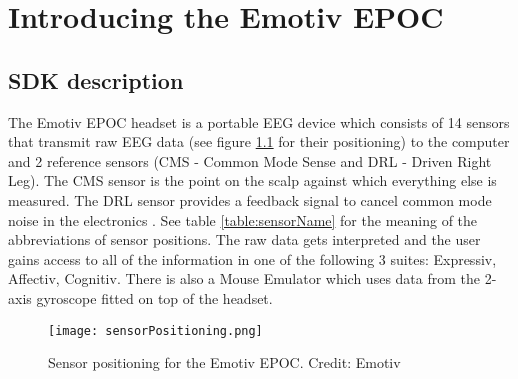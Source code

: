 \chapter{Introducing the Emotiv EPOC}
\label{cha:epoc}

\section{SDK description}
The Emotiv EPOC headset is a portable EEG device which consists of 14 sensors that transmit raw EEG data (see figure \ref{fig:sensorPos} for their positioning) to the computer and 2 reference sensors (CMS - Common Mode Sense and DRL - Driven Right Leg). The CMS sensor is the point on the scalp against which everything else is measured. The DRL sensor provides a feedback signal to cancel common mode noise in the electronics \cite{refSensors1, refSensors2}. See table \ref{table:sensorName} for the meaning of the abbreviations of sensor positions. The raw data gets interpreted and the user gains access to all of the information in one of the following 3 suites: Expressiv, Affectiv, Cognitiv. There is also a Mouse Emulator which uses data from the 2-axis gyroscope fitted on top of the headset. 

\begin{figure}
  \centering
  \texttt{[image: sensorPositioning.png]}
  \caption{Sensor positioning for the Emotiv EPOC. Credit: Emotiv}
    \label{fig:sensorPos}           
\end{figure}

